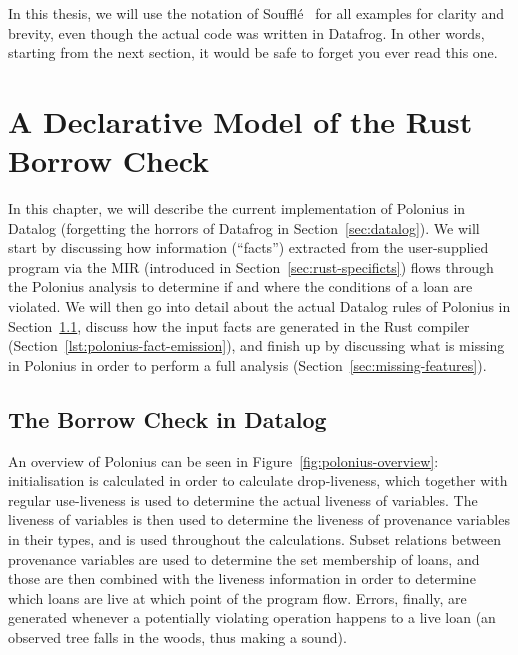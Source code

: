 \documentclass[11pt,a4paper,twoside,openany,draft]{report}
\newcommand{\fixme}[1] {{\color{red}#1}}
\begin{document}
In this thesis, we will use the notation of Souffl{\'e}~\cite{scholz_fast_2016}
for all examples for clarity and brevity, even though the actual code was
written in Datafrog. In other words, starting from the next section, it would be
safe to forget you ever read this one.

\chapter{A Declarative Model of the Rust Borrow Check}
\label{cha:investigation}

In this chapter, we will describe the current implementation of Polonius in
Datalog (forgetting the horrors of Datafrog in Section~\ref{sec:datalog}). We
will start by discussing how information (``facts'') extracted from the
user-supplied program via the MIR (introduced in
Section~\ref{sec:rust-specificts}) flows through the Polonius analysis to
determine if and where the conditions of a loan are violated. We will then go
into detail about the actual Datalog rules of Polonius in
Section~\ref{sec:borr-check-datal}, discuss how the input facts are generated in
the Rust compiler (Section~\ref{lst:polonius-fact-emission}), and finish up by
discussing what is missing in Polonius in order to perform a full analysis
(Section~\ref{sec:missing-features}).

\section{The Borrow Check in Datalog}\label{sec:borr-check-datal}

An overview of Polonius can be seen in Figure~\ref{fig:polonius-overview}:
initialisation is calculated in order to calculate drop-liveness, which together
with regular use-liveness is used to determine the actual liveness of variables.
The liveness of variables is then used to determine the liveness of provenance
variables in their types, and is used throughout the calculations. Subset
relations between provenance variables are used to determine the set membership
of loans, and those are then combined with the liveness information in order to
determine which loans are live at which point of the program flow. Errors,
finally, are generated whenever a potentially violating operation happens to a
live loan (an observed tree falls in the woods, thus making a sound).
\end{document}
